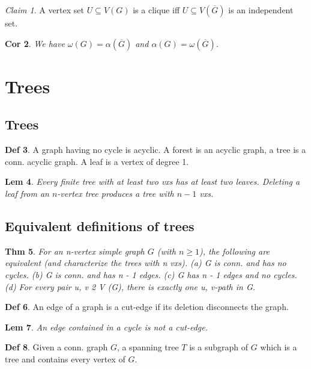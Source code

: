 \documentclass[11pt, fleqn, a4paper, landscape]{article}
\theoremstyle{plain} %
\newtheorem{thm}{Thm}
\newtheorem{lem}[thm]{Lem}
\newtheorem{cor}[thm]{Cor}
\theoremstyle{remark} %
\newtheorem{claim}[thm]{Claim}
\theoremstyle{definition} %
\newtheorem{defi}[thm]{Def}
\begin{document}
\begin{multicols}{5}
\begin{claim}
A vertex set $U\subseteq V (G)$ is a clique iff $U\subseteq V(\overline{G})$ is an independent set.
\end{claim}

\begin{cor}
We have $\omega(G)=\alpha(\overline{G})$ and $\alpha(G)=\omega(\overline{G})$.
\end{cor}

\section{Trees}
\subsection{Trees}
\begin{defi}
A graph having no cycle is acyclic. A forest is an acyclic graph, a tree is a conn. acyclic graph. A leaf is a vertex of degree 1.
\end{defi}
\addtocounter{thm}{1}
\begin{lem}
Every finite tree with at least two vxs has at least two leaves. Deleting a leaf from an $n$-vertex tree produces a tree with $n-1$ vxs.
\end{lem}

\subsection{Equivalent definitions of trees}

\begin{thm}
For an n-vertex simple graph $G$ (with $n \ge 1$), the following are equivalent (and
characterize the trees with n vxs).
(a) G is conn. and has no cycles.
(b) G is conn. and has n - 1 edges.
(c) G has n - 1 edges and no cycles.
(d) For every pair u, v 2 V (G), there is exactly one u, v-path in G.
\end{thm}

\begin{defi}
An edge of a graph is a cut-edge if its deletion disconnects the graph.
\end{defi}

\begin{lem}
An edge contained in a cycle is not a cut-edge.
\end{lem}


\begin{defi}
Given a conn. graph $G$, a spanning tree $T$ is a subgraph of $G$ which is a tree and contains every vertex of $G$.
\end{defi}


\end{multicols}
\end{document}
